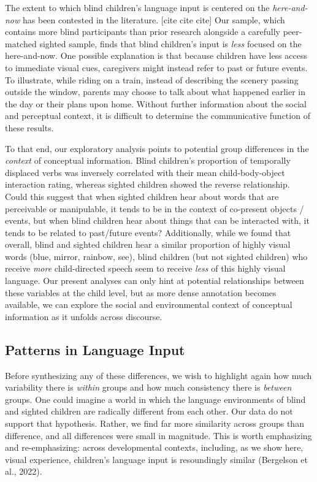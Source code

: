 \documentclass[
  man,floatsintext]{apa6}
\begin{document}
The extent to which blind children's language input is centered on the \emph{here-and-now} has been contested in the literature. {[}cite cite cite{]} Our sample, which contains more blind participants than prior research alongside a carefully peer-matched sighted sample, finds that blind children's input is \emph{less} focused on the here-and-now. One possible explanation is that because children have less access to immediate visual cues, caregivers might instead refer to past or future events. To illustrate, while riding on a train, instead of describing the scenery passing outside the window, parents may choose to talk about what happened earlier in the day or their plans upon home. Without further information about the social and perceptual context, it is difficult to determine the communicative function of these results.

To that end, our exploratory analysis points to potential group differences in the \emph{context} of conceptual information. Blind children's proportion of temporally displaced verbs was inversely correlated with their mean child-body-object interaction rating, whereas sighted children showed the reverse relationship. Could this suggest that when sighted children hear about words that are perceivable or manipulable, it tends to be in the context of co-present objects / events, but when blind children hear about things that can be interacted with, it tends to be related to past/future events? Additionally, while we found that overall, blind and sighted children hear a similar proportion of highly visual words (blue, mirror, rainbow, see), blind children (but not sighted children) who receive \emph{more} child-directed speech seem to receive \emph{less} of this highly visual language. Our present analyses can only hint at potential relationships between these variables at the child level, but as more dense annotation becomes available, we can explore the social and environmental context of conceptual information as it unfolds across discourse.

\hypertarget{patterns-in-language-input-1}{%
\subsection{Patterns in Language Input}\label{patterns-in-language-input-1}}

Before synthesizing any of these differences, we wish to highlight again how much variability there is \emph{within} groups and how much consistency there is \emph{between} groups. One could imagine a world in which the language environments of blind and sighted children are radically different from each other. Our data do not support that hypothesis. Rather, we find far more similarity across groups than difference, and all differences were small in magnitude. This is worth emphasizing and re-emphasizing: across developmental contexts, including, as we show here, visual experience, children's language input is resoundingly similar (Bergelson et al., 2022).
\end{document}
